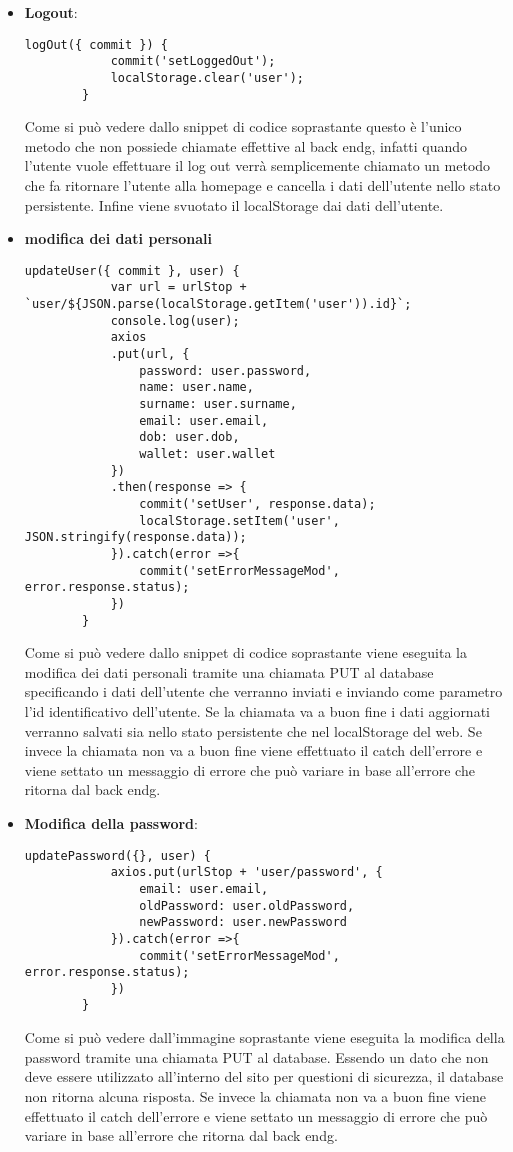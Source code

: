 \begin{itemize}
	\item \textbf{Logout}:
	\begin{lstlisting}[caption=Logout., label=lst::logout]
		logOut({ commit }) {
			commit('setLoggedOut');
			localStorage.clear('user');
		}
	\end{lstlisting}
	Come si può vedere dallo snippet di codice soprastante questo è l'unico metodo che non possiede chiamate effettive al \gls{back endg}, infatti quando l'utente vuole effettuare il log out verrà semplicemente chiamato un metodo che fa ritornare l'utente alla homepage e cancella i dati dell'utente nello stato persistente. Infine viene svuotato il localStorage dai dati dell'utente.
	\item \textbf{modifica dei dati personali}
	\begin{lstlisting}[caption=Modifica dei dati personali., label=lst::modDati]
		updateUser({ commit }, user) {
			var url = urlStop + `user/${JSON.parse(localStorage.getItem('user')).id}`;
			console.log(user);
			axios
			.put(url, {
				password: user.password,
				name: user.name,
				surname: user.surname,
				email: user.email,
				dob: user.dob,
				wallet: user.wallet
			})
			.then(response => {
				commit('setUser', response.data);
				localStorage.setItem('user', JSON.stringify(response.data));
			}).catch(error =>{
				commit('setErrorMessageMod', error.response.status);
			})
		}
	\end{lstlisting}
	Come si può vedere dallo snippet di codice soprastante viene eseguita la modifica dei dati personali tramite una chiamata PUT al database specificando i dati dell'utente che verranno inviati e inviando come parametro l'id identificativo dell'utente. Se la chiamata va a buon fine i dati aggiornati verranno salvati sia nello stato persistente che nel localStorage del web. Se invece  la chiamata non va a buon fine viene effettuato il catch dell'errore e viene settato un messaggio di errore che può variare in base all'errore che ritorna dal \gls{back endg}.
	\item \textbf{Modifica della password}:
	\begin{lstlisting}[caption=Modifica della password., label=lst::modPassword]
		updatePassword({}, user) {
			axios.put(urlStop + 'user/password', {
				email: user.email,
				oldPassword: user.oldPassword,
				newPassword: user.newPassword
			}).catch(error =>{
				commit('setErrorMessageMod', error.response.status);
			})
		}
	\end{lstlisting}
	Come si può vedere dall'immagine soprastante viene eseguita la modifica della password tramite una chiamata PUT al database. Essendo un dato che non deve essere utilizzato all'interno del sito per questioni di sicurezza, il database non ritorna alcuna risposta. Se invece  la chiamata non va a buon fine viene effettuato il catch dell'errore e viene settato un messaggio di errore che può variare in base all'errore che ritorna dal \gls{back endg}.
\end{itemize}

